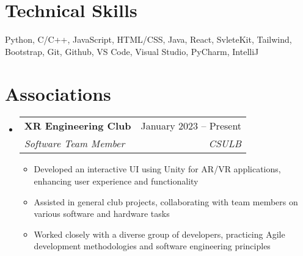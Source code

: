 \documentclass[letterpaper,11pt]{article}
\makeatletter
\newcommand{\resumeItem}[1]{
  \item\small{
    {#1 \vspace{-2pt}}
  }
}
\newcommand{\resumeSubheading}[4]{
  \vspace{-2pt}\item
    \begin{tabular*}{0.97\textwidth}[t]{l@{\extracolsep{\fill}}r}
      \textbf{#1} & #2 \\
      \textit{\small#3} & \textit{\small #4} \\
    \end{tabular*}\vspace{-7pt}
}
\newcommand{\resumeSubHeadingListStart}{\begin{itemize}[leftmargin=0.15in, label={}]}
\newcommand{\resumeSubHeadingListEnd}{\end{itemize}}
\newcommand{\resumeItemListStart}{\begin{itemize}}
\newcommand{\resumeItemListEnd}{\end{itemize}\vspace{-5pt}}
\makeatother
\begin{document}
%
\section{Technical Skills}
 \begin{itemize}[leftmargin=0.15in, label={}]
    \small{\item{
     { Python, C/C++, JavaScript, HTML/CSS, Java, React, SvleteKit, Tailwind, Bootstrap, Git, Github, VS Code, Visual Studio, PyCharm, IntelliJ} \\  
    }}
 \end{itemize}



\section{Associations}
  \resumeSubHeadingListStart

    \resumeSubheading
      {XR Engineering Club}{January 2023 -- Present}
      {Software Team Member}{CSULB}
      \resumeItemListStart
        \resumeItem{Developed an interactive UI using Unity for AR/VR applications, enhancing user experience and functionality}
        \resumeItem{Assisted in general club projects, collaborating with team members on various software and hardware tasks}
        \resumeItem{Worked closely with a diverse group of developers, practicing Agile development methodologies and software engineering principles}
      \resumeItemListEnd
    \resumeSubHeadingListEnd
\end{document}

